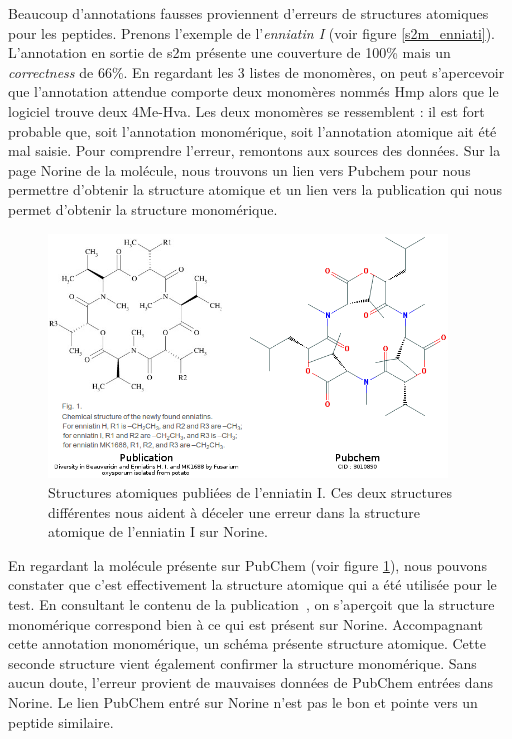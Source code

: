 Beaucoup d'annotations fausses proviennent d'erreurs de structures atomiques pour les peptides.
Prenons l'exemple de l'\textit{enniatin I} (voir figure \ref{s2m_enniati}).
L'annotation en sortie de s2m présente une couverture de 100\% mais un \textit{correctness} de 66\%.
En regardant les 3 listes de monomères, on peut s'apercevoir que l'annotation attendue comporte deux monomères nommés Hmp alors que le logiciel trouve deux 4Me-Hva.
Les deux monomères se ressemblent : il est fort probable que, soit l'annotation monomérique, soit l'annotation atomique ait été mal saisie.
Pour comprendre l'erreur, remontons aux sources des données.
Sur la page Norine de la molécule, nous trouvons un lien vers Pubchem pour nous permettre d'obtenir la structure atomique et un lien vers la publication qui nous permet d'obtenir la structure monomérique.

\begin{figure}[h!]
  \begin{center}
    \includegraphics[width=400px]{Figures/s2m/results/enniatinI_corrections.png}
    \caption{\label{enni_cor}Structures atomiques publiées de l'enniatin I.
    Ces deux structures différentes nous aident à déceler une erreur dans la structure atomique de l'enniatin I sur Norine.}
  \end{center}
\end{figure}

En regardant la molécule présente sur PubChem (voir figure \ref{enni_cor}), nous pouvons constater que c'est effectivement la structure atomique qui a été utilisée pour le test.
En consultant le contenu de la publication~\cite{song_diversity_2008}, on s'aperçoit que la structure monomérique correspond bien à ce qui est présent sur Norine.
Accompagnant cette annotation monomérique, un schéma présente structure atomique.
Cette seconde structure vient également confirmer la structure monomérique.
Sans aucun doute, l'erreur provient de mauvaises données de PubChem entrées dans Norine.
Le lien PubChem entré sur Norine n'est pas le bon et pointe vers un peptide similaire.

